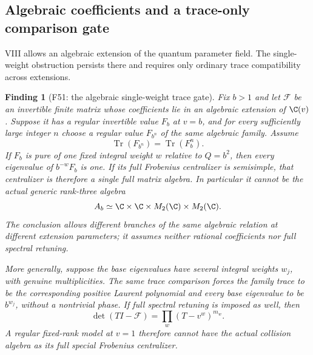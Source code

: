 \documentclass[11pt,a4paper]{article}
\newcommand{\fid}[1]{\textsf{#1}}\newcommand{\gate}[1]{\textsf{#1}}
\theoremstyle{named}\newtheorem{finding}{Finding}[section]
\theoremstyle{definition}\newtheorem{definition}[finding]{Definition}
\theoremstyle{remark}\newtheorem{remark}[finding]{Remark}
\begin{document}
\subsection{Algebraic coefficients and a trace-only comparison gate}
VIII allows an algebraic extension of the quantum parameter field.
The single-weight obstruction persists there and requires only
ordinary trace compatibility across extensions.

\begin{finding}[\fid{F51}: the algebraic single-weight trace gate]\label{f:algebraictrace}
Fix $b>1$ and let $\mathcal F$ be an invertible finite matrix
whose coefficients lie in an algebraic extension of $\C(v)$.
Suppose it has a regular invertible value $F_b$ at $v=b$,
and for every sufficiently large integer $n$ choose a regular
value $F_{b^n}$ of the same algebraic family.
Assume
\begin{equation}\label{eq:algebraictraceretune}
 \operatorname{Tr}(F_{b^n})=\operatorname{Tr}(F_b^n).
\end{equation}
If $F_b$ is pure of one fixed integral weight $w$ relative
to $Q=b^2$, then every eigenvalue of $b^{-w}F_b$ is one.
If its full Frobenius centralizer is semisimple, that
centralizer is therefore a single full matrix algebra.
In particular it cannot be the actual generic rank-three
algebra
\[
 A_b\simeq\C\times\C\times M_2(\C)\times M_2(\C).
\]
The conclusion allows different branches of the same
algebraic relation at different extension parameters;
it assumes neither rational coefficients nor full
spectral retuning.

More generally, suppose the base eigenvalues have several
integral weights $w_j$, with genuine multiplicities.
The same trace comparison forces the family trace to be
the corresponding positive Laurent polynomial and every
base eigenvalue to be $b^{w_j}$, without a nontrivial phase.
If full spectral retuning is imposed as well, then
\[
 \det(TI-\mathcal F)=\prod_w(T-v^w)^{m_w}.
\]
A regular fixed-rank model at $v=1$ therefore cannot
have the actual collision algebra as its full special
Frobenius centralizer.
\end{finding}
\end{document}
